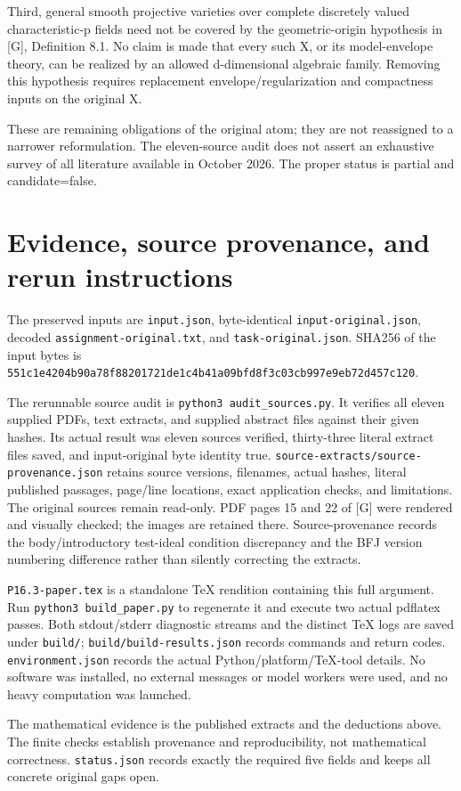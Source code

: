 \documentclass[11pt]{article}
\begin{document}
Third, general smooth projective varieties over complete discretely valued characteristic-p fields need not be covered by the geometric-origin hypothesis in [G], Definition 8.1. No claim is made that every such X, or its model-envelope theory, can be realized by an allowed d-dimensional algebraic family. Removing this hypothesis requires replacement envelope/regularization and compactness inputs on the original X.

These are remaining obligations of the original atom; they are not reassigned to a narrower reformulation. The eleven-source audit does not assert an exhaustive survey of all literature available in October 2026. The proper status is partial and candidate=false.

\section{Evidence, source provenance, and rerun instructions}

The preserved inputs are \texttt{input.js\allowbreak{}on}, byte-identical \texttt{input-or\allowbreak{}iginal.j\allowbreak{}son}, decoded \texttt{assignme\allowbreak{}nt-origi\allowbreak{}nal.txt}, and \texttt{task-ori\allowbreak{}ginal.js\allowbreak{}on}. SHA256 of the input bytes is \texttt{551c1e42\allowbreak{}04b90a78\allowbreak{}f8820172\allowbreak{}1de1c4b4\allowbreak{}1a09bfd8\allowbreak{}f3c03cb9\allowbreak{}97e9eb72\allowbreak{}d457c120}.

The rerunnable source audit is \texttt{python3 \allowbreak{}audit\_so\allowbreak{}urces.py}. It verifies all eleven supplied PDFs, text extracts, and supplied abstract files against their given hashes. Its actual result was eleven sources verified, thirty-three literal extract files saved, and input-original byte identity true. \texttt{source-e\allowbreak{}xtracts/\allowbreak{}source-p\allowbreak{}rovenanc\allowbreak{}e.json} retains source versions, filenames, actual hashes, literal published passages, page/line locations, exact application checks, and limitations. The original sources remain read-only. PDF pages 15 and 22 of [G] were rendered and visually checked; the images are retained there. Source-provenance records the body/introductory test-ideal condition discrepancy and the BFJ version numbering difference rather than silently correcting the extracts.

\texttt{P16.3-pa\allowbreak{}per.tex} is a standalone TeX rendition containing this full argument. Run \texttt{python3 \allowbreak{}build\_pa\allowbreak{}per.py} to regenerate it and execute two actual pdflatex passes. Both stdout/stderr diagnostic streams and the distinct TeX logs are saved under \texttt{build/}; \texttt{build/bu\allowbreak{}ild-resu\allowbreak{}lts.json} records commands and return codes. \texttt{environm\allowbreak{}ent.json} records the actual Python/platform/TeX-tool details. No software was installed, no external messages or model workers were used, and no heavy computation was launched.

The mathematical evidence is the published extracts and the deductions above. The finite checks establish provenance and reproducibility, not mathematical correctness. \texttt{status.j\allowbreak{}son} records exactly the required five fields and keeps all concrete original gaps open.
\end{document}
